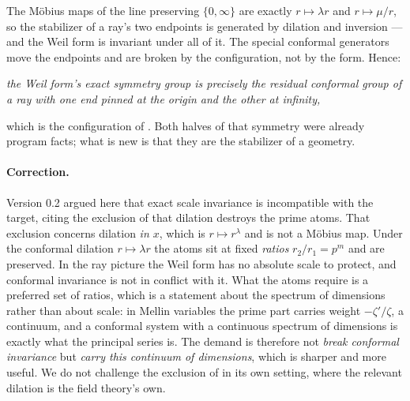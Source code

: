 The Möbius maps of the line preserving $\{0,\infty\}$ are exactly
$r\mapsto\lambda r$ and $r\mapsto\mu/r$, so the stabilizer of a ray's two
endpoints is generated by dilation and inversion --- and the Weil form is
invariant under all of it. The special conformal generators move the endpoints
and are broken by the configuration, not by the form. Hence:

\begin{center}
\emph{the Weil form's exact symmetry group is precisely the residual conformal
group of a ray with one end pinned at the origin and the other at infinity,}
\end{center}

which is the configuration of \cite{OWL}. Both halves of that symmetry were
already program facts; what is new is that they are the stabilizer of a geometry.

\paragraph{Correction.} Version 0.2 argued here that exact scale invariance is
incompatible with the target, citing the exclusion of \cite{ExclusionMap} that
dilation destroys the prime atoms. That exclusion concerns dilation \emph{in
$x$}, which is $r\mapsto r^\lambda$ and is not a Möbius map. Under the conformal
dilation $r\mapsto\lambda r$ the atoms sit at fixed \emph{ratios}
$r_2/r_1=p^m$ and are preserved. In the ray picture the Weil form has no absolute
scale to protect, and conformal invariance is not in conflict with it. What the
atoms require is a preferred set of ratios, which is a statement about the
spectrum of dimensions rather than about scale: in Mellin variables the prime
part carries weight $-\zeta'/\zeta$, a continuum, and a conformal system with a
continuous spectrum of dimensions is exactly what the principal series is. The
demand is therefore not \emph{break conformal invariance} but \emph{carry this
continuum of dimensions}, which is sharper and more useful. We do not challenge
the exclusion of \cite{ExclusionMap} in its own setting, where the relevant
dilation is the field theory's own.

